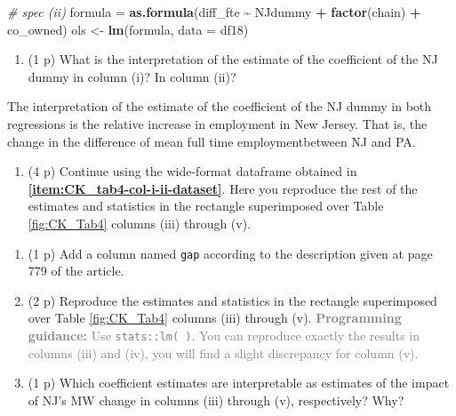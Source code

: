 \documentclass[
]{article}
\newenvironment{Shaded}{\begin{snugshade}}{\end{snugshade}}
\newcommand{\AttributeTok}[1]{\textcolor[rgb]{0.13,0.29,0.53}{#1}}
\newcommand{\CommentTok}[1]{\textcolor[rgb]{0.56,0.35,0.01}{\textit{#1}}}
\newcommand{\FunctionTok}[1]{\textcolor[rgb]{0.13,0.29,0.53}{\textbf{#1}}}
\newcommand{\NormalTok}[1]{#1}
\newcommand{\OtherTok}[1]{\textcolor[rgb]{0.56,0.35,0.01}{#1}}
\newcommand{\SpecialCharTok}[1]{\textcolor[rgb]{0.81,0.36,0.00}{\textbf{#1}}}
\providecommand{\tightlist}{%
  \setlength{\itemsep}{0pt}\setlength{\parskip}{0pt}}
\begin{document}
\begin{Shaded}
\begin{Highlighting}[]
\CommentTok{\# spec (ii)}
\NormalTok{formula }\OtherTok{=} \FunctionTok{as.formula}\NormalTok{(diff\_fte }\SpecialCharTok{\textasciitilde{}}\NormalTok{ NJdummy }\SpecialCharTok{+} \FunctionTok{factor}\NormalTok{(chain) }\SpecialCharTok{+}\NormalTok{ co\_owned)}
\NormalTok{ols }\OtherTok{\textless{}{-}} \FunctionTok{lm}\NormalTok{(formula, }\AttributeTok{data =}\NormalTok{ df18)}
\end{Highlighting}
\end{Shaded}

\begin{enumerate}
\def\labelenumi{\alph{enumi}.}
\setcounter{enumi}{3}
\tightlist
\item
  (1 p) What is the interpretation of the estimate of the coefficient of
  the NJ dummy in column (i)? In column (ii)?
\end{enumerate}

The interpretation of the estimate of the coefficient of the NJ dummy in
both regressions is the relative increase in employment in New Jersey.
That is, the change in the difference of mean full time
employmentbetween NJ and PA.

\begin{enumerate}
\def\labelenumi{\arabic{enumi}.}
\setcounter{enumi}{18}
\tightlist
\item
  (4 p) Continue using the wide-format dataframe obtained in
  \textbf{\ref{item:CK_tab4-col-i-ii-dataset}}. Here you reproduce the
  rest of the estimates and statistics in the rectangle superimposed
  over Table \ref{fig:CK_Tab4} columns (iii) through (v).
\end{enumerate}

\begin{enumerate}
\def\labelenumi{\alph{enumi}.}
\item
  (1 p) Add a column named \texttt{gap} according to the description
  given at page 779 of the article.
\item
  (2 p) Reproduce the estimates and statistics in the rectangle
  superimposed over Table \ref{fig:CK_Tab4} columns (iii) through (v).
  \textcolor{gray}{\textbf{Programming guidance:} Use \texttt{stats::lm( )}. You can reproduce exactly the results in columns (iii) and (iv), you will find a slight discrepancy for column (v).}
\item
  (1 p) Which coefficient estimates are interpretable as estimates of
  the impact of NJ's MW change in columns (iii) through (v),
  respectively? Why?
\end{enumerate}
\end{document}
